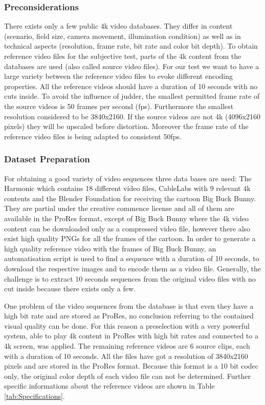 \subsubsection{Preconsiderations}
There exists only a few public 4k video databases. They differ in content (scenario, field size, camera movement, illumination condition) as well as in technical aspects (resolution, frame rate, bit rate and color bit depth). 
To obtain reference video files for the subjective test, parts of the 4k content from the databases are used (also called source video files).
For our test we want to have a large variety between the reference video files to evoke different encoding properties. 
All the reference videos should have a duration of 10 seconds with no cuts inside.
To avoid the influence of judder, the smallest permitted frame rate of the source videos is 50 frames per second (fps). Furthermore the smallest resolution considered to be 3840x2160. If the source videos are not 4k (4096x2160 pixels) they will be upscaled before distortion. Moreover the frame rate of the reference video files is being adapted to consistent 50fps.
\newline

\subsubsection{Dataset Preparation}
For obtaining a good variety of video sequences three data bases are used: The Harmonic \cite{web:harmonic} which contains 18 different video files, CableLabs \cite{web:cablelabs} with 9 relevant 4k contents and the Blender Foundation \cite{web:bbb} for receiving the cartoon Big Buck Bunny. They  are partial under the creative commence license and all of them are available in the ProRes format, except of Big Buck Bunny where the 4k video content can be downloaded only as a compressed video file, however there also exist high quality PNGs for all the frames of the cartoon. In order to generate a high quality reference video with the frames of Big Buck Bunny, an automatisation script is used to find a sequence with a duration of 10 seconds, to download the respective images and to encode them as a video file.
Generally, the challenge is to extract 10 seconds sequences from the original video files with no cut inside because there exists only a few.

One problem of the video sequences from the database is that even they have a high bit rate and are stored as ProRes, no conclusion referring to the contained visual quality can be done. 
For this reason a preselection with a very powerful system, able to play 4k content in ProRes with high bit rates and connected to a 4k screen, was applied.
The remaining reference videos are 6 source clips, each with a duration of 10 seconds. All the files have got a resolution of 3840x2160 pixels and are stored in the ProRes format. Because this format is a 10 bit codec only, the original color depth of each video file can not be determined.
Further specific informations about the reference videos are shown in Table \ref{tab:Specifications}.

